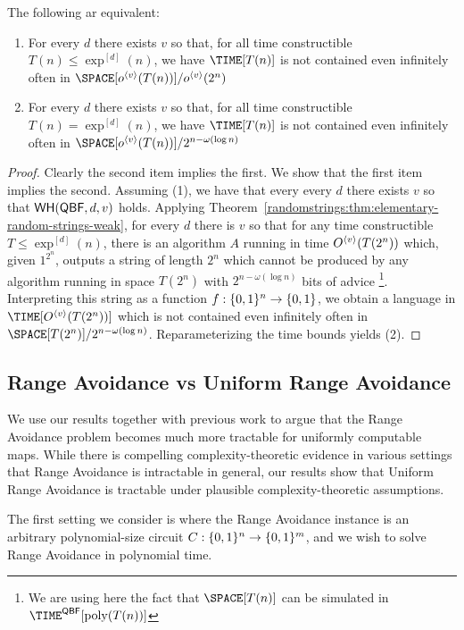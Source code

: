 \begin{theorem} The following ar equivalent:
\begin{enumerate}
    \item For every $d$ there exists $v$ so that, for all time constructible $T (n) \leq \exp^{[d]}(n)$, we have $\TIME[T(n)]$ is not contained even infinitely often in $\SPACE[o^{\langle v\rangle }(T(n))]/o^{\langle v \rangle}(2^n)$ 
    \item For every $d$ there exists $v$ so that, for all time constructible $T (n) = \exp^{[d]}(n)$, we have $\TIME[T(n)]$ is not contained even infinitely often in $\SPACE[o^{\langle v\rangle }(T(n))]/2^{n - \omega(\log n)}$ 
\end{enumerate}
\end{theorem}
\begin{proof}
Clearly the second item implies the first. We show that the first item implies the second. Assuming (1), we have that every every $d$ there exists $v$ so that $\mathsf{WH}(\mathsf{QBF}, d, v)$ holds. Applying Theorem~\ref{randomstrings:thm:elementary-random-strings-weak}, for every $d$ there is $v$ so that for any time constructible $T\leq \exp^{[d]}(n)$, there is an algorithm $A$ running in time $O^{\langle v \rangle}(T(2^n))$ which, given $1^{2^n}$, outputs a string of length $2^n$ which cannot be produced by any algorithm running in space $T(2^n)$ with $2^{n - \omega(\log n)}$ bits of advice \footnote{We are using here the fact that $\SPACE[T(n)]$ can be simulated in $\TIME^{\mathsf{QBF}}[\poly(T(n))]$}. Interpreting this string as a function $f: \{0,1\}^n \to \{0,1\}$, we obtain a language in $\TIME[\od{v}(T(2^n))]$ which is not contained even infinitely often in $\SPACE[T(2^n)]/2^{n - \omega(\log n)}$. Reparameterizing the time bounds yields (2).
\end{proof}
\subsection{Range Avoidance vs Uniform Range Avoidance}\label{randomstrings:subsec:uniform-vs-nonuniform}


We use our results together with previous work to argue that the Range Avoidance problem becomes much more tractable for uniformly computable maps. While there is compelling complexity-theoretic evidence in various settings that Range Avoidance is intractable in general, our results show that Uniform Range Avoidance is tractable under plausible complexity-theoretic assumptions.

The first setting we consider is where the Range Avoidance instance is an arbitrary polynomial-size circuit $C: \{0,1\}^n \to \{0,1\}^m$, and we wish to solve Range Avoidance in polynomial time.

